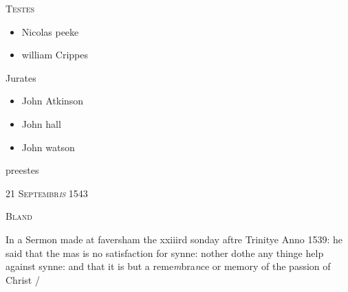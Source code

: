 \documentclass[12pt, a4paper]{book}
\begin{document}
		
			\begin{center} {\scshape Testes} \end{center}\begin{itemize}
				
				\item[]Nicolas peeke
				\item[]william Crippes
			\end{itemize}
			
		\ifthenelse{\isodd{\thepage}}
		{\reversemarginpar}
		{\normalmarginpar}
		 Jurates
			\begin{itemize}
				\item[]John Atkinson
				\item[]John hall
				\item[]John watson
			\end{itemize}
			
		\ifthenelse{\isodd{\thepage}}
		{\reversemarginpar}
		{\normalmarginpar}
		 preestes
		
		 
		
		            
            
               
				\begin{center} \begin{large} {\scshape 
                  21 Septembr\textit{is} 1543
               } \end{large} \end{center}
			
               
                  
				\begin{center}  {\scshape Bland}  \end{center}
			

               	
		\ifthenelse{\isodd{\thepage}}
		{\reversemarginpar}
		{\normalmarginpar}
		In a Sermon made at faversham the xxiiird sonday
 aftre Trinitye Anno 1539: he said that the mas
 is no satisfaction for synne: nother dothe any thinge
 help against synne: and that it is but a reme\textit{m}bra\textit{n}ce
 or memory of the passion of Christ /



\dotfill
					  \subsection*{}  \subsection*{}
\end{document}
